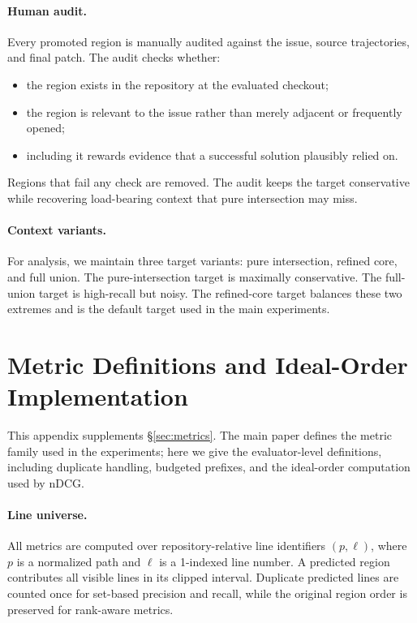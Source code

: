 \paragraph{Human audit.}
Every promoted region is manually audited against the issue, source
trajectories, and final patch. The audit checks whether:
\begin{itemize}
    \item the region exists in the repository at the evaluated checkout;
    \item the region is relevant to the issue rather than merely adjacent or frequently opened;
    \item including it rewards evidence that a successful solution plausibly relied on.
\end{itemize}
Regions that fail any check are removed. The audit keeps the target conservative
while recovering load-bearing context that pure intersection may miss.

\paragraph{Context variants.}
For analysis, we maintain three target variants: pure intersection, refined core,
and full union. The pure-intersection target is maximally conservative. The
full-union target is high-recall but noisy. The refined-core target balances
these two extremes and is the default target used in the main experiments.


\section{Metric Definitions and Ideal-Order Implementation}
\label{app:metrics}

This appendix supplements \S\ref{sec:metrics}. The main paper defines the metric
family used in the experiments; here we give the evaluator-level definitions,
including duplicate handling, budgeted prefixes, and the ideal-order computation
used by nDCG.

\paragraph{Line universe.}
All metrics are computed over repository-relative line identifiers $(p,\ell)$,
where $p$ is a normalized path and $\ell$ is a 1-indexed line number. A predicted
region contributes all visible lines in its clipped interval. Duplicate
predicted lines are counted once for set-based precision and recall, while the
original region order is preserved for rank-aware metrics.

